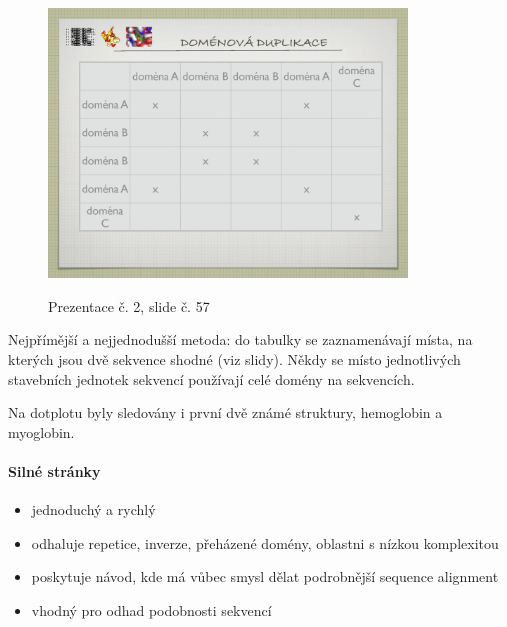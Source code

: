 \documentclass[DIV=8]{scrreprt}
\begin{document}
\begin{figure}
    \caption{Prezentace č. 2, slide č. 57}
    \includegraphics[width=0.85\textwidth]{slides-2/slide-57.jpg}
    \centering
    \label{slides-2-slide-57}
\end{figure}

Nejpřímější a nejjednodušší metoda: do tabulky se zaznamenávají místa, na kterých jsou dvě sekvence shodné (viz slidy). Někdy se místo jednotlivých stavebních jednotek sekvencí používají celé domény na sekvencích.

Na dotplotu byly sledovány i první dvě známé struktury, hemoglobin a myoglobin.

\paragraph{Silné stránky}
\begin{itemize}[nosep]
    \item jednoduchý a rychlý
    \item odhaluje repetice, inverze, přeházené domény, oblastni s nízkou komplexitou
    \item poskytuje návod, kde má vůbec smysl dělat podrobnější sequence alignment
    \item vhodný pro odhad podobnosti sekvencí
\end{itemize}
\end{document}
